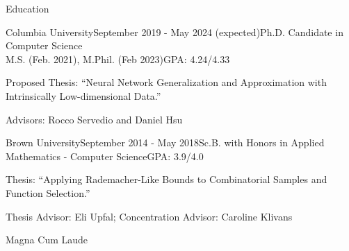 \documentclass{cv} %
\begin{document}

\begin{rSection}{Education}

\begin{rSubsection}{Columbia University}{September 2019 - May 2024 (expected)}{Ph.D. Candidate in Computer Science \\ M.S. (Feb. 2021), M.Phil. (Feb 2023)}{GPA: 4.24/4.33}
\item Proposed Thesis: ``Neural Network Generalization and Approximation with Intrinsically Low-dimensional Data.''
\item Advisors: Rocco Servedio and Daniel Hsu
\end{rSubsection}

\begin{rSubsection}{Brown University}{September 2014 - May 2018}{Sc.B. with Honors in Applied Mathematics - Computer Science}{GPA: 3.9/4.0}
\item Thesis: ``Applying Rademacher-Like Bounds to Combinatorial Samples and Function Selection.''
\item Thesis Advisor: Eli Upfal; Concentration Advisor: Caroline Klivans
\item Magna Cum Laude
\end{rSubsection}

\end{rSection}




\end{document}

